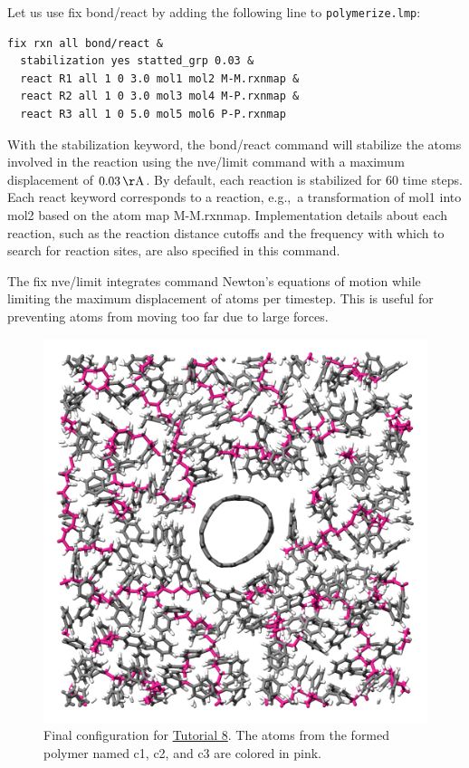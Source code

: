 \documentclass[9pt,tutorial]{livecoms}
\newcommand{\lmpcmd}[1]{\colorbox{listing}{\textcolor{command}{\small{#1}}}} %
\newcommand{\flecmd}[1]{\textcolor{command}{\texttt{#1}}} %
\begin{document}
Let us use \lmpcmd{fix bond/react} by adding the following
line to \flecmd{polymerize.lmp}:
\begin{lstlisting}
fix rxn all bond/react &
  stabilization yes statted_grp 0.03 &
  react R1 all 1 0 3.0 mol1 mol2 M-M.rxnmap &
  react R2 all 1 0 3.0 mol3 mol4 M-P.rxnmap &
  react R3 all 1 0 5.0 mol5 mol6 P-P.rxnmap
\end{lstlisting}
With the \lmpcmd{stabilization} keyword, the \lmpcmd{bond/react} command will
stabilize the atoms involved in the reaction using the \lmpcmd{nve/limit}
command with a maximum displacement of $0.03\,\mathrm{\AA{}}$.  By default,
each reaction is stabilized for 60 time steps.  Each \lmpcmd{react} keyword
corresponds to a reaction, e.g.,~a transformation of \lmpcmd{mol1} into \lmpcmd{mol2}
based on the atom map \lmpcmd{M-M.rxnmap}.  Implementation details about each reaction,
such as the reaction distance cutoffs and the frequency with which to search for
reaction sites, are also specified in this command.

\begin{note}
{\color{blue}The \lmpcmd{fix nve/limit} integrates command Newton's equations of motion
while limiting the maximum displacement of atoms per timestep.  This is
useful for preventing atoms from moving too far due to large forces.}
\end{note}

\begin{figure}
\centering
\includegraphics[width=\linewidth]{REACT-final.png}
\caption{Final configuration for \hyperref[bond-react-label]{Tutorial 8}.
The atoms from the formed polymer named \lmpcmd{c1}, \lmpcmd{c2}, and
\lmpcmd{c3} are colored in pink.}
\label{fig:REACT-final}
\end{figure}
\end{document}
